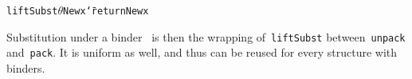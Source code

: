 \documentclass[9pt,preprint,authoryear]{sigplanconf}
\begin{document}
{{{}\vphantom{$\{$}}}\textcolor[rgb]{0,0,0.80}{\texttt{liftSubst}}\textcolor[rgb]{0,0,0.80}{\texttt{\mbox{\hspace{0.50em}}}}\textcolor[rgb]{0,0,0.80}{\texttt{\makebox[1.22ex][c]{\_{}}}}\textcolor[rgb]{0,0,0.80}{\texttt{\mbox{\hspace{0.50em}}}}\textcolor[rgb]{0,0,0.80}{\texttt{$ \theta $}}\textcolor[rgb]{0,0,0.80}{\texttt{\mbox{\hspace{0.50em}}}}\textcolor[cmyk]{0,0.65,0.99,0}{\texttt{\makebox[1.22ex][l]{$ {(} $}}}\textcolor[rgb]{0.70,0.13,0.13}{\texttt{New}}\textcolor[rgb]{0,0,0.80}{\texttt{\mbox{\hspace{0.50em}}}}\textcolor[rgb]{0,0,0.80}{\texttt{x}}\textcolor[cmyk]{0,0.65,0.99,0}{\texttt{\makebox[1.22ex][r]{$ {)} $}}}\textcolor[rgb]{0,0,0.80}{\texttt{\mbox{\hspace{0.50em}}}}\textcolor[cmyk]{0,0.65,0.99,0}{\texttt{{\char `\=}}}\textcolor[rgb]{0,0,0.80}{\texttt{\mbox{\hspace{0.50em}}}}\textcolor[rgb]{0,0,0.80}{\texttt{return}}\textcolor[rgb]{0,0,0.80}{\texttt{\mbox{\hspace{0.50em}}}}\textcolor[cmyk]{0,0.65,0.99,0}{\texttt{\makebox[1.22ex][l]{$ {(} $}}}\textcolor[rgb]{0.70,0.13,0.13}{\texttt{New}}\textcolor[rgb]{0,0,0.80}{\texttt{\mbox{\hspace{0.50em}}}}\textcolor[rgb]{0,0,0.80}{\texttt{x}}\textcolor[cmyk]{0,0.65,0.99,0}{\texttt{\makebox[1.22ex][r]{$ {)} $}}}\textcolor[rgb]{0,0,0.80}{\texttt{{\nopagebreak \newline%
}\vphantom{$\{$}}}%


%
Substitution under a binder{~}\textcolor[cmyk]{0,0.65,0.99,0}{\texttt{\makebox[1.22ex][l]{$ {(} $}}}\textcolor[rgb]{0,0,0.80}{\texttt{\makebox[1.22ex][c]{\textgreater{}}\makebox[1.22ex][c]{\textgreater{}}}}\textcolor[cmyk]{0,0.65,0.99,0}{\texttt{\makebox[1.22ex][r]{$ {)} $}}} is then the wrapping
    of{~}\textcolor[rgb]{0,0,0.80}{\texttt{liftSubst}} between{~}\textcolor[rgb]{0,0,0.80}{\texttt{unpack}} and{~}\textcolor[rgb]{0,0,0.80}{\texttt{pack}}. It is uniform as
    well, and thus can be reused for every structure with binders.%


{\nopagebreak }
\end{document}
